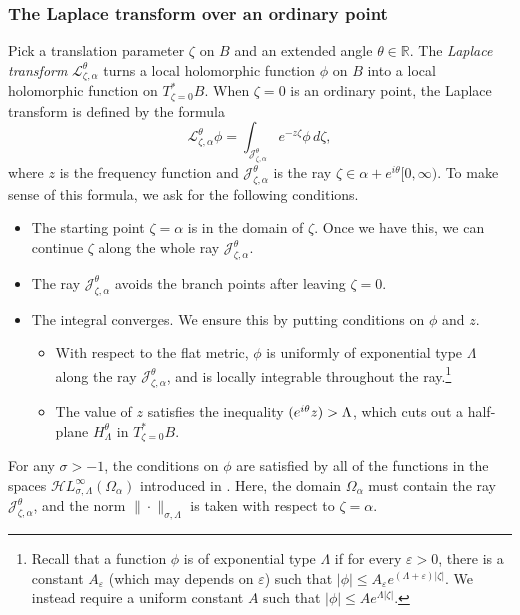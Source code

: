 \documentclass{article}
\let\Re\relax
\DeclareMathOperator{\Re}{Re}
\newcommand{\singexp}[2]{\mathcal{H}L^\infty_{#1, #2}}
\newcommand{\R}{\mathbb{R}}
\newcommand{\laplace}{\mathcal{L}}
\theoremstyle{definition}
\theoremstyle{plain}
\begin{document}
\subsubsection{The Laplace transform over an ordinary point}\label{laplace:ordinary}
Pick a translation parameter $\zeta$ on $B$ and an extended angle $\theta \in \R$. The {\em Laplace transform} $\laplace_{\zeta, \alpha}^\theta$ turns a local holomorphic function $\phi$ on $B$ into a local holomorphic function on $T^*_{\zeta = 0} B$. When $\zeta = 0$ is an ordinary point, the Laplace transform is defined by the formula
\begin{equation}\label{laplace:int}
\laplace_{\zeta, \alpha}^\theta \phi = \int_{\mathcal{J}_{\zeta, \alpha}^\theta} e^{-z\zeta} \phi\,d\zeta,
\end{equation}
where $z$ is the frequency function and $\mathcal{J}_{\zeta, \alpha}^\theta$ is the ray $\zeta \in \alpha + e^{i\theta} [0, \infty)$. To make sense of this formula, we ask for the following conditions.
\begin{itemize}
\item The starting point $\zeta = \alpha$ is in the domain of $\zeta$. Once we have this, we can continue $\zeta$ along the whole ray $\mathcal{J}_{\zeta, \alpha}^\theta$.
\item The ray $\mathcal{J}_{\zeta, \alpha}^\theta$ avoids the branch points after leaving $\zeta = 0$.
\item The integral converges. We ensure this by putting conditions on $\phi$ and $z$.
\begin{itemize}
\item With respect to the flat metric, $\phi$ is uniformly of exponential type $\Lambda$ along the ray $\mathcal{J}_{\zeta, \alpha}^\theta$, and is locally integrable throughout the ray.\footnote{Recall that a function $\phi$ is of exponential type $\Lambda$ if for every $\varepsilon>0$, there is a constant $A_\varepsilon$ (which may depends on $\varepsilon$) such that $|\phi|\le A_\varepsilon e^{(\Lambda+\varepsilon)|\zeta|}$. We instead require a uniform constant $A$ such that $|\phi| \le A e^{\Lambda|\zeta|}$.}
\item The value of $z$ satisfies the inequality $\Re(e^{i\theta} z) > \Lambda$, which cuts out a half-plane $H^\theta_\Lambda$ in $T^*_{\zeta = 0} B$.
\end{itemize}
\end{itemize}
For any $\sigma > -1$, the conditions on $\phi$ are satisfied by all of the functions in the spaces $\singexp{\sigma}{\Lambda}(\Omega_\alpha)$ introduced in \cite{reg-sing-volterra}. Here, the domain $\Omega_\alpha$ must contain the ray $\mathcal{J}_{\zeta, \alpha}^\theta$, and the norm $\|\cdot\|_{\sigma, \Lambda}$ is taken with respect to $\zeta = \alpha$.
\end{document}
